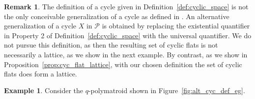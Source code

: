 \documentclass[a4paper,11pt,reqno]{article}
\theoremstyle{definition}
\newtheorem{example}[theorem]{{{Example}}}
\newtheorem{remark}[theorem]{{{Remark}}}
\newcommand{\mP}{\mathcal{P}}
\begin{document}
\begin{remark}\label{rem:alt_cyc}
    The definition of a cycle given in Definition~\ref{def:cyclic_space} is not the only conceivable generalization of a cycle as defined in \cite{AlfByr22,Csirm20}. An alternative generalization of a cycle $X$ in $\mP$ is obtained by replacing the existential quantifier in Property 2 of Definition~\ref{def:cyclic_space} with the universal quantifier. We do not pursue this definition, as then the resulting set of cyclic flats is not necessarily a lattice, as we show in the next example. By contrast, as we show in Proposition~\ref{prop:cyc_flat_lattice}, with our chosen definition the set of cyclic flats does form a lattice.
\end{remark}

\begin{example}
    Consider the $q$-polymatroid shown in Figure~\ref{fig:alt_cyc_def_eg}. 
    \begin{figure}[!ht]
        \centering
\end{figure}
\end{example}
\end{document}
